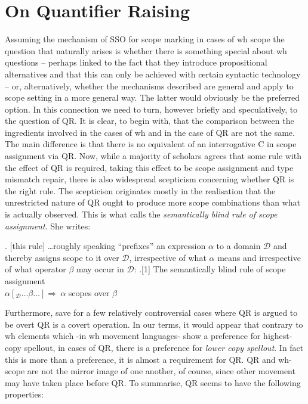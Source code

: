 \documentclass[charis]{glossa}
\begin{document}
\section{On Quantifier Raising}
Assuming the mechanism of SSO for scope marking in cases of wh scope the question that naturally arises is whether there is something special about wh questions -- perhaps linked to the fact that they introduce propositional alternatives and that this can only be achieved with certain syntactic technology -- or, alternatively, whether the mechanisms described are general and apply to scope setting in a more general way.  The latter would obviously be the preferred option.  In this connection we need to turn, however briefly and speculatively, to the question of QR.  It is clear, to begin with, that the comparison between the ingredients involved in the cases of wh and in the case of QR are not the same.  The main difference is that there is no equivalent of an interrogative C in scope assignment via QR.  Now, while a majority of scholars agrees that some rule with the effect of QR is required, taking this effect to be scope assignment and type mismatch repair, there is also widespread scepticism concerning whether QR is the right rule.  The scepticism originates mostly in the realisation that the unrestricted nature of QR ought to produce more scope combinations than what is actually observed. This is what\cite{szabolcsi:1997c} calls the
\emph{semantically blind rule of scope assignment}.  She writes:

\ex.  [this rule] \ldots roughly speaking ``prefixes'' an expression
$\alpha$ to a domain $\mathcal{D}$ and thereby assigns scope to it
over $\mathcal{D}$, irrespective of what $\alpha$ means and
irrespective of what operator $\beta$ may occur in $\mathcal{D}$:
\ex.[1] The semantically blind rule of scope assignment\\
 $\alpha[_{\mathcal{D}} \ldots \beta \ldots] \Rightarrow \
\alpha$ scopes over $ \beta$
\begin{flushright}
\cite[109]{szabolcsi:1997c}
\end{flushright}

Furthermore, save for a few relatively controversial cases where QR is argued to be overt \citep{fox-nissenbaum:99} QR is a covert operation.  In our terms, it would appear that contrary to wh elements which -in wh movement languages- show a preference for highest-copy spellout, in cases of QR, there is a preference for  \textit{lower copy spellout}.  In fact this is more than a preference, it is almost a requirement for QR.  QR and wh-scope are not the mirror image of one another, of course, since other movement may have taken place before QR.  To summarise, QR seems to have the following properties:
\end{document}
